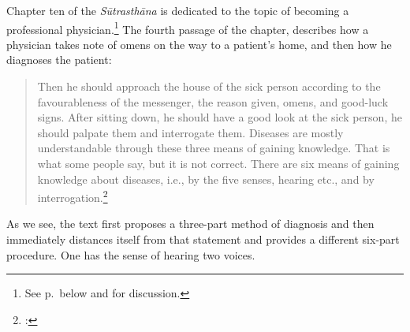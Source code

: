Chapter ten of the \emph{Sūtrasthāna} is dedicated to the topic of becoming a 
professional physician.\footnote{See p.\,\pageref{visikhapravesaniyam} below and 
\cite{wuja-2025} for discussion.}
The fourth passage of the chapter, describes how a physician takes note of omens 
on the way to a patient’s home, and then how he diagnoses the patient:
\begin{quote}
    Then he should approach the house of the sick person according to
the favourableness of the messenger, the reason given, omens, and
good-luck signs. After sitting down, he should have a good look at
the sick person, he should palpate them and interrogate them.
Diseases are mostly understandable through these three means of
gaining knowledge. That is what some people say, but it is not
correct. There are six means of gaining knowledge about diseases,
i.e., by the five senses, hearing etc., and by
interrogation.\footnote{\cite[43]{vulgate}: }
\end{quote}
As we see, the text first proposes a three-part method of diagnosis
and then immediately distances itself from that statement and provides
a different six-part procedure. One has the sense of hearing two
voices.

